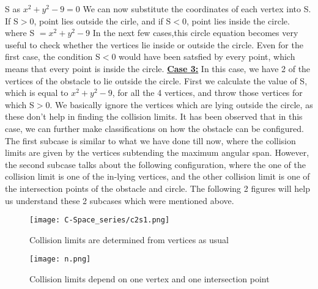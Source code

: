 \documentclass[12pt]{article}
\begin{document}
S as $x^2 + y^2 - 9 = 0$
\newline
We can now substitute the coordinates of each vertex into S.
\newline
If S$>$0, point lies outside the cirle, and if S$<$0, point lies inside the circle.
\newline
where S $=x^2 + y^2 - 9 $
\newline
In the next few cases,this circle equation becomes very useful to check whether the vertices lie inside or outside the circle. Even for the first case, the condition S$<$0 would have been satsfied by every point, which means that every point is inside the circle.
\newline
\newline
\underline{\textbf{Case 3:}}
\newline
In this case, we have 2 of the vertices of the obstacle to lie outside the circle. First we calculate the value of S, which is equal to $x^2 + y^2 - 9$, for all the 4 vertices, and throw those vertices for which S$>$0. We basically ignore the vertices which are lying outside the circle, as these don't help in finding the collision limits.
\newline
\newline
It has been observed that in this case, we can further make classifications on how the obstacle can be configured. The first subcase is similar to what we have done till now, where the collision limits are given by the vertices subtending the maximum angular span. However, the second subcase talks about the following configuration, where the one of the collision limit is one of the in-lying vertices, and the other collision limit is one of the intersection points of the obstacle and circle.
\newline
\newline
The following 2 figures will help us understand these 2 subcases which were mentioned above.
\begin{figure}[h!]
    \centering
    \begin{minipage}{0.48\textwidth}
        \centering
        \texttt{[image: C-Space\_series/c2s1.png]}
        \caption{Collision limits are \newline
        determined from vertices as usual}
        \label{fig:c2s1}
    \end{minipage}
    \hfill
    \begin{minipage}{0.48\textwidth}
        \centering
        \texttt{[image: n.png]}
        \caption{Collision limits depend on one vertex and one intersection point}
        \label{fig:n}
    \end{minipage}
\end{figure}
\end{document}

